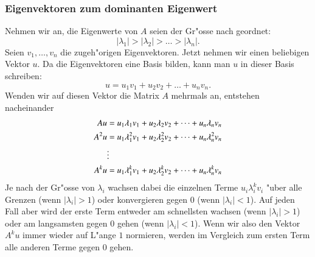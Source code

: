 \subsubsection{Eigenvektoren zum dominanten Eigenwert\label{section:dominant}}
Nehmen wir an, die Eigenwerte von $A$
seien der Gr"osse nach geordnet:
\[
|\lambda_1| > |\lambda_2| > \dots > |\lambda_n|.
\]
Seien $v_1,\dots,v_n$ die zugeh"origen Eigenvektoren. Jetzt nehmen wir
einen beliebigen Vektor $u$. Da die Eigenvektoren eine Basis bilden,
kann man $u$ in dieser Basis schreiben:
\[
u=u_1v_1+u_2v_2+\dots+u_nv_n.
\]
Wenden wir auf diesen Vektor die Matrix $A$ mehrmals an, entstehen
nacheinander
\begin{align}
Au&=
u_1\lambda_1v_1+u_2\lambda_2v_2+\dots+u_n\lambda_nv_n
\notag
\\
A^2u&=
u_1\lambda_1^2v_1+u_2\lambda_2^2v_2+\dots+u_n\lambda_n^2v_n
\notag
\\
&\vdots
\\
A^ku&=
u_1\lambda_1^kv_1+u_2\lambda_2^kv_2+\dots+u_n\lambda_n^kv_n
\label{power-method-vectors}
\end{align}
Je nach der Gr"osse von $\lambda_i$ wachsen dabei die einzelnen
Terme $u_i\lambda_i^kv_i$ "uber alle Grenzen (wenn $|\lambda_i|>1$)
oder konvergieren gegen $0$ (wenn $|\lambda_i|<1$). Auf jeden Fall
aber wird der erste Term entweder am schnellsten wachsen (wenn $|\lambda_i|>1$)
oder am langsamsten gegen $0$ gehen (wenn $|\lambda_i|<1$). Wenn wir
also den Vektor $A^ku$ immer wieder auf L"ange $1$ normieren, 
werden im Vergleich zum ersten Term alle anderen Terme gegen $0$ gehen.

